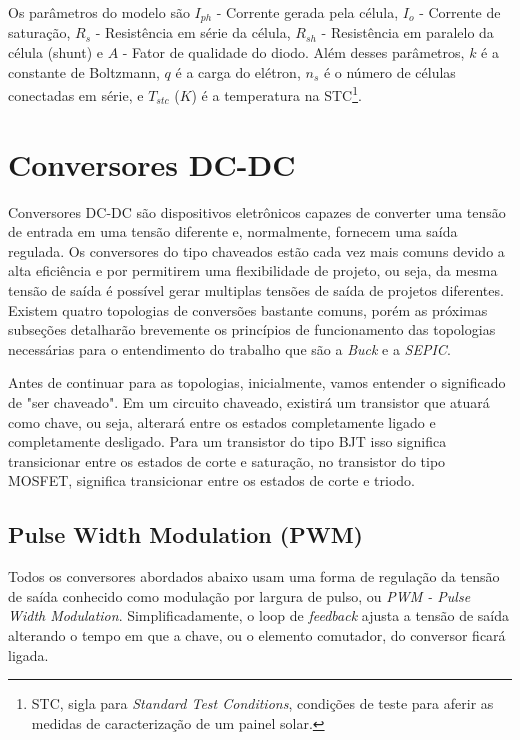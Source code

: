 Os parâmetros do modelo são $I_{ph}$ - Corrente gerada pela célula, $I_{o}$ - Corrente de saturação, $R_{s}$ - Resistência em série da célula, $R_{sh}$ - Resistência em paralelo da célula (shunt) e $A$ - Fator de qualidade do diodo. Além desses parâmetros, $k$ é a constante de Boltzmann, $q$ é a carga do elétron, $n_{s}$ é o número de células conectadas em série, e $T_{stc}$ ($K$) é a temperatura na STC\footnote{STC, sigla para \textit{Standard Test Conditions}, condições de teste para aferir as medidas de caracterização de um painel solar.}.

\section{Conversores DC-DC}\label{converters_revision}
Conversores DC-DC \cite{ti_whitepaper}\cite{power_electronics_hart} são dispositivos eletrônicos capazes de converter uma tensão de entrada em uma tensão diferente e, normalmente, fornecem uma saída regulada. Os conversores do tipo chaveados estão cada vez mais comuns devido a alta eficiência e por permitirem uma flexibilidade de projeto, ou seja, da mesma tensão de saída é possível gerar multiplas tensões de saída de projetos diferentes. Existem quatro topologias de conversões bastante comuns, porém as próximas subseções detalharão brevemente os princípios de funcionamento das topologias necessárias para o entendimento do trabalho que são a \textit{Buck} e a \textit{SEPIC}.

Antes de continuar para as topologias, inicialmente, vamos entender o significado de "ser chaveado". Em um circuito chaveado, existirá um transistor que atuará como chave, ou seja, alterará entre os estados completamente ligado e completamente desligado. Para um transistor do tipo BJT isso significa transicionar entre os estados de corte e saturação, no transistor do tipo MOSFET, significa transicionar entre os estados de corte e triodo. 

\subsection*{Pulse Width Modulation (PWM)}
Todos os conversores abordados abaixo usam uma forma de regulação da tensão de saída conhecido como modulação por largura de pulso, ou \textit{PWM - Pulse Width Modulation}. Simplificadamente, o loop de \textit{feedback} ajusta a tensão de saída alterando o tempo em que a chave, ou o elemento comutador, do conversor ficará ligada.

